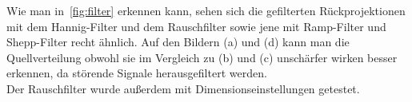 \documentclass[slug=PET, room=Andreas-Schubert-Bau\,\ 424A, supervisor=Carsten\ Bittrich, coursedate=10.\ 01.\ 2020]{../../Lab_Report_LaTeX/lab_report}
\begin{document}
Wie man in~\ref{fig:filter} erkennen kann, sehen sich die gefilterten Rückprojektionen mit dem
Hannig-Filter und dem Rauschfilter sowie jene mit Ramp-Filter und Shepp-Filter recht ähnlich.
Auf den Bildern (a) und (d) kann man die Quellverteilung obwohl sie im Vergleich zu (b) und (c)
unschärfer wirken besser erkennen, da störende Signale herausgefiltert werden.\\


Der Rauschfilter wurde außerdem mit Dimensionseinstellungen getestet.
\end{document}
